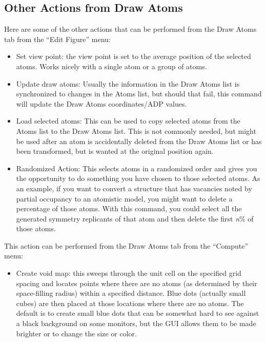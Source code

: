 \subsection{Other Actions from Draw Atoms}
Here are some of the other actions that can be performed from the Draw Atoms tab from the ``Edit Figure'' menu:
\begin{itemize}
    \item Set view point: the view point is set to the average position of the selected atoms. Works nicely with a single atom or a group of atoms. 
    \item Update draw atoms: Usually the information in the Draw Atoms list is synchronized to changes in the Atoms list, but should that fail, this command will update the Draw Atoms coordinates/ADP values. 
    \item Load selected atoms: This can be used to copy selected atoms from the Atoms list to the Draw Atoms list. This is not commonly needed, but might be used after an atom is accidentally deleted from the Draw Atoms list or has been transformed, but is wanted at the original position again. 
    \item Randomized Action: This selects atoms in a randomized order and gives you the opportunity to do something you have chosen to those selected atoms. As an example, if you want to convert a structure that has vacancies noted by partial occupancy to an atomistic model, you might want to delete a percentage of those atoms. With this command, you could select all the generated symmetry replicants of that atom and then delete the first \textit{n}\% of those atoms. 
\end{itemize}

This action can be performed from the Draw Atoms tab from the ``Compute'' menu:
\begin{itemize}
    \item Create void map: this sweeps through the unit cell on the specified grid spacing and locates points where there are no atoms (as determined by their space-filling radius) within a specified distance. Blue dots (actually small cubes) are then placed at those locations where there are no atoms. The default is to create small blue dots that can be somewhat hard to see against a black background on some monitors, but the GUI allows them to be made brighter or to change the size or color.
\end{itemize}
